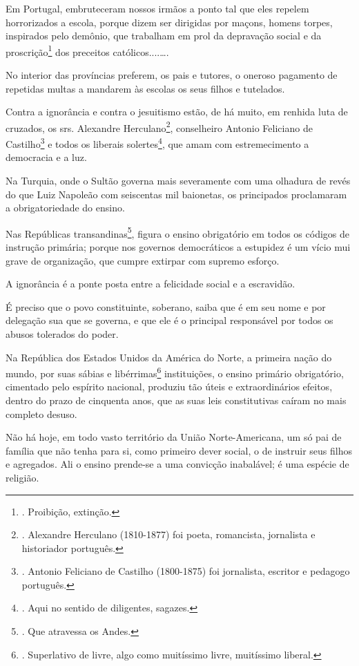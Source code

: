 Em Portugal, embruteceram nossos irmãos a ponto tal que eles repelem
horrorizados a escola, porque dizem ser dirigidas por maçons, homens
torpes, inspirados pelo demônio, que trabalham em prol da depravação
social e da proscrição\footnote{. Proibição, extinção.} dos preceitos
católicos....\ldots.

No interior das províncias preferem, os pais e tutores, o oneroso
pagamento de repetidas multas a mandarem às escolas os seus filhos e
tutelados.

Contra a ignorância e contra o jesuitismo estão, de há muito, em renhida
luta de cruzados, os srs. Alexandre Herculano\footnote{. Alexandre
  Herculano (1810-1877) foi poeta, romancista, jornalista e historiador
  português.}, conselheiro Antonio Feliciano de Castilho\footnote{.
  Antonio Feliciano de Castilho (1800-1875) foi jornalista, escritor e
  pedagogo português.} e todos os liberais solertes\footnote{. Aqui no
  sentido de diligentes, sagazes.}, que amam com estremecimento a
democracia e a luz.

Na Turquia, onde o Sultão governa mais severamente com uma olhadura de
revés do que Luiz Napoleão com seiscentas mil baionetas, os principados
proclamaram a obrigatoriedade do ensino.

Nas Repúblicas transandinas\footnote{. Que atravessa os Andes.}, figura
o ensino obrigatório em todos os códigos de instrução primária; porque
nos governos democráticos a estupidez é um vício mui grave de
organização, que cumpre extirpar com supremo esforço.

A ignorância é a ponte posta entre a felicidade social e a escravidão.

É preciso que o povo constituinte, soberano, saiba que é em seu nome e
por delegação sua que se governa, e que ele é o principal responsável
por todos os abusos tolerados do poder.

Na República dos Estados Unidos da América do Norte, a primeira nação do
mundo, por suas sábias e libérrimas\footnote{. Superlativo de livre,
  algo como muitíssimo livre, muitíssimo liberal.} instituições, o
ensino primário obrigatório, cimentado pelo espírito nacional, produziu
tão úteis e extraordinários efeitos, dentro do prazo de cinquenta anos,
que as suas leis constitutivas caíram no mais completo desuso.

Não há hoje, em todo vasto território da União Norte-Americana, um só
pai de família que não tenha para si, como primeiro dever social, o de
instruir seus filhos e agregados. Ali o ensino prende-se a uma convicção
inabalável; é uma espécie de religião.

